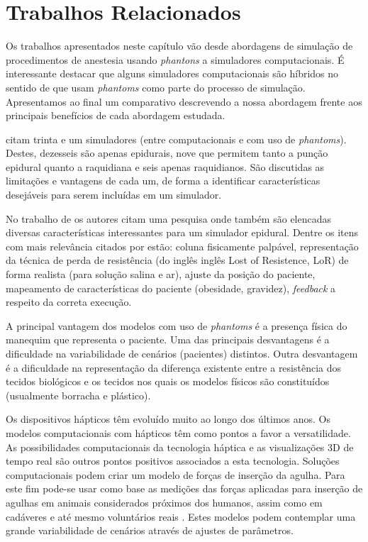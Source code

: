 \chapter{Trabalhos Relacionados} \label{cap:cap3}

Os trabalhos apresentados neste capítulo vão desde abordagens de simulação de procedimentos de anestesia usando \textit{phantons} a simuladores computacionais. É interessante destacar que alguns simuladores computacionais são híbridos no sentido de que usam \textit{phantoms} como parte do processo de simulação. Apresentamos ao final um comparativo descrevendo a nossa abordagem frente aos principais benefícios de cada abordagem estudada.  

\textcite{Vaughan2013} citam trinta e um simuladores (entre computacionais e com uso de \textit{phantoms}). Destes, dezesseis são apenas epidurais, nove que permitem tanto a punção epidural quanto a raquidiana e seis apenas raquidianos. São discutidas as limitações e vantagens de cada um, de forma a identificar características desejáveis para serem incluídas em um simulador. 

No trabalho de \textcite{Isaacs2015} os autores citam uma pesquisa onde também são elencadas diversas características interessantes para um simulador epidural. Dentre os itens com mais relevância citados por \textcite{Isaacs2015} estão: coluna fisicamente palpável, representação da técnica de perda de resistência (do inglês inglês Lost of Resistence, \acrshort{LoR}) de forma realista (para solução salina e ar), ajuste da posição do paciente, mapeamento de características do paciente (obesidade, gravidez), \textit{feedback} a respeito da correta execução.

A principal vantagem dos modelos com uso de \textit{phantoms} é a presença física do manequim que representa o paciente. Uma das principais desvantagens é a dificuldade na variabilidade de cenários (pacientes) distintos. Outra desvantagem é a dificuldade na representação da diferença existente entre a resistência dos tecidos biológicos e os tecidos nos quais os modelos físicos são constituídos (usualmente borracha e plástico).

Os dispositivos hápticos têm evoluído muito ao longo dos últimos anos. Os modelos computacionais com hápticos têm como pontos a favor a versatilidade. As possibilidades computacionais da tecnologia háptica e as visualizações 3D de tempo real são outros pontos positivos associados a esta tecnologia. 
Soluções computacionais podem criar um modelo de forças de inserção da agulha. Para este fim pode-se usar como base as medições das forças aplicadas para inserção de agulhas em animais considerados próximos dos humanos, assim como em cadáveres e até mesmo voluntários reais \cite{Hiemenz1998, Holton2001,Langton1990,McKay2010,Naemura2009,Tran2009,Vaughan2012}. Estes modelos podem contemplar uma grande variabilidade de cenários através de ajustes de parâmetros. 


